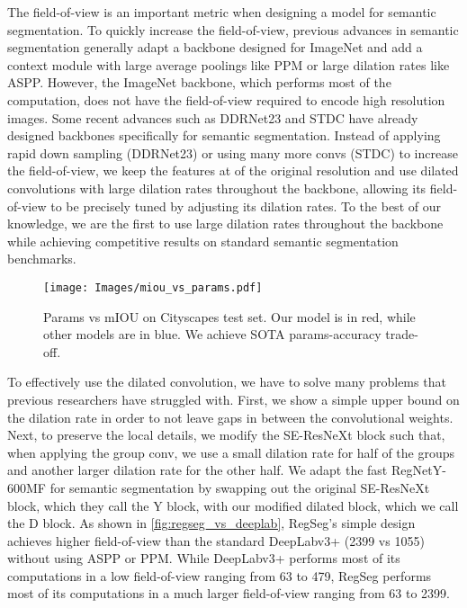 \documentclass[10pt,twocolumn,letterpaper]{article}
\begin{document}
The field-of-view is an important metric when designing a model for semantic segmentation. To quickly increase the field-of-view, previous advances in semantic segmentation generally adapt a backbone designed for ImageNet\cite{deng2009imagenet} and add a context module with large average poolings like PPM\cite{pspnet} or large dilation rates like ASPP\cite{deeplabv3}. However, the ImageNet backbone, which performs most of the computation, does not have the field-of-view required to encode high resolution images. Some recent advances such as DDRNet23\cite{ddrnet} and STDC\cite{stdc} have already designed backbones specifically for semantic segmentation. Instead of applying rapid down sampling (DDRNet23) or using many more  convs (STDC) to increase the field-of-view, we keep the features at  of the original resolution and use dilated convolutions with large dilation rates throughout the backbone, allowing its field-of-view to be precisely tuned by adjusting its dilation rates. To the best of our knowledge, we are the first to use large dilation rates throughout the backbone while achieving competitive results on standard semantic segmentation benchmarks. 

\begin{figure}
  \centering
    \texttt{[image: Images/miou\_vs\_params.pdf]}

   \caption{Params vs mIOU on Cityscapes test set. Our model is in red, while other models are in blue. We achieve SOTA params-accuracy trade-off.}
   \label{fig:miouVsParams}
\end{figure}



To effectively use the dilated convolution, we have to solve many problems that previous researchers have struggled with. First, we show a simple upper bound on the dilation rate in order to not leave gaps in between the convolutional weights. Next, to preserve the local details, we modify the SE-ResNeXt\cite{hu2018squeeze,resnext} block such that, when applying the  group conv, we use a small dilation rate for half of the groups and another larger dilation rate for the other half. We adapt the fast RegNetY-600MF\cite{regnet,regnetz} for semantic segmentation by swapping out the original SE-ResNeXt block, which they call the Y block, with our modified dilated block, which we call the D block. As shown in \cref{fig:regseg_vs_deeplab}, RegSeg's simple design achieves higher field-of-view than the standard DeepLabv3+ (2399 vs 1055) without using ASPP or PPM. While DeepLabv3+ performs most of its computations in a low field-of-view ranging from 63 to 479, RegSeg performs most of its computations in a much larger field-of-view ranging from 63 to 2399.
\end{document}
